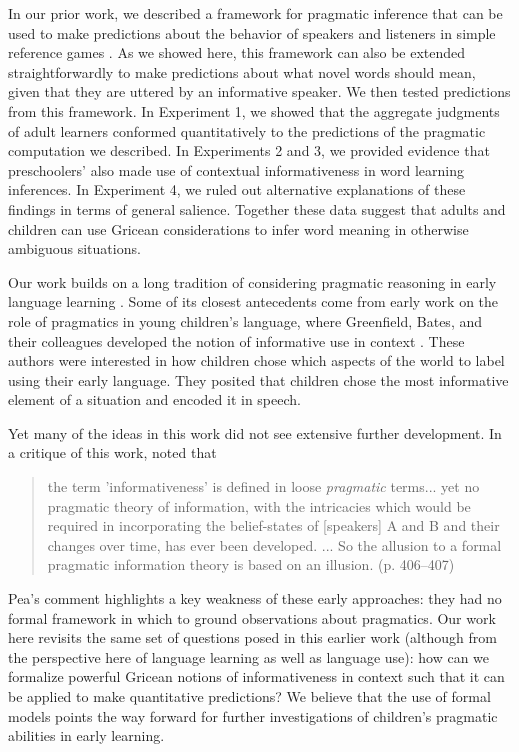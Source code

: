 \documentclass[review]{elsarticle}
\begin{document}
In our prior work, we described a framework for pragmatic inference that can be used to make predictions about the behavior of speakers and listeners in simple reference games \citep{frank2012}. As we showed here, this framework can also be extended straightforwardly to make predictions about what novel words should mean, given that they are uttered by an informative speaker.  We then tested predictions from this framework. In Experiment 1, we showed that the aggregate judgments of adult learners conformed quantitatively to the predictions of the pragmatic computation we described. In Experiments 2 and 3, we provided evidence that preschoolers' also made use of contextual informativeness in word learning inferences. In Experiment 4, we ruled out alternative explanations of these findings in terms of general salience. Together these data suggest that adults and children can use Gricean considerations to infer word meaning in otherwise ambiguous situations. 

Our work builds on a long tradition of considering pragmatic reasoning in early language learning \citep{clark2003,bloom2002,tomasello2003}. Some of its closest antecedents come from early work on the role of pragmatics in young children's language, where Greenfield, Bates, and their colleagues developed the notion of informative use in context \citep{bates1976,greenfield1976,greenfield1978}. These authors were interested in how children chose which aspects of the world to label using their early language. They posited that children chose the most informative element of a situation and encoded it in speech. 

Yet many of the ideas in this work did not see extensive further development. In a critique of this work, \citet{pea1979} noted that

\begin{quote}
the term 'informativeness' is defined in loose \emph{pragmatic} terms... yet no pragmatic theory of information, with the intricacies which would be required in incorporating the belief-states of [speakers] A and B and their changes over time, has ever been developed. ... So the allusion to a formal pragmatic information theory is based on an illusion. (p. 406--407)
\end{quote}

\noindent Pea's comment highlights a key weakness of these early approaches: they had no formal framework in which to ground observations about pragmatics. Our work here revisits the same set of questions posed in this earlier work (although from the perspective here of language learning as well as language use): how can we formalize powerful Gricean notions of informativeness in context such that it can be applied to make quantitative predictions? We believe that the use of formal models points the way forward for further investigations of children's pragmatic abilities in early learning.
\end{document}
